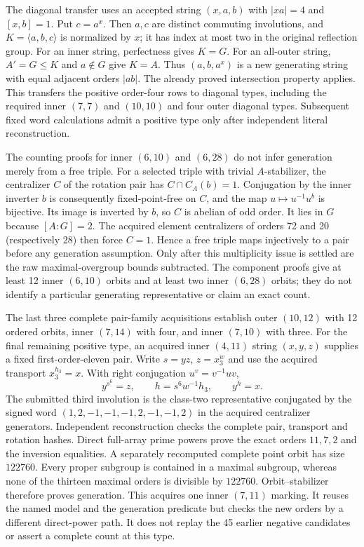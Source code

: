 \documentclass[11pt,a4paper]{article}
\newcommand{\gen}[1]{\langle #1\rangle}
\begin{document}
The diagonal transfer uses an accepted string $(x,a,b)$ with
$|xa|=4$ and $[x,b]=1$. Put $c=a^x$. Then $a,c$ are distinct commuting
involutions, and $K=\gen{a,b,c}$ is normalized by $x$; it has index at
most two in the original reflection group. For an inner string,
perfectness gives $K=G$. For an all-outer string, $A'=G\leq K$ and
$a\notin G$ give $K=A$. Thus $(a,b,a^x)$ is a new generating string
with equal adjacent orders $|ab|$. The already proved intersection
property applies. This transfers the positive order-four rows to diagonal
types, including the required inner $(7,7)$ and $(10,10)$ and four
outer diagonal types. Subsequent fixed word calculations admit a positive
type only after independent literal reconstruction.

The counting proofs for inner $(6,10)$ and $(6,28)$ do not infer
generation merely from a free triple. For a selected triple with trivial
$A$-stabilizer, the centralizer $C$ of the rotation pair has
$C\cap C_A(b)=1$. Conjugation by the inner inverter $b$ is consequently
fixed-point-free on $C$, and the map
$u\mapsto u^{-1}u^b$ is bijective. Its image is inverted by $b$, so
$C$ is abelian of odd order. It lies in $G$ because $[A:G]=2$.
The acquired element centralizers of orders 72 and 20 (respectively 28)
then force $C=1$. Hence a free triple maps injectively to a pair before
any generation assumption. Only after this multiplicity issue is settled
are the raw maximal-overgroup bounds subtracted. The component proofs
give at least 12 inner $(6,10)$ orbits and at least two inner $(6,28)$
orbits; they do not identify a particular generating representative or
claim an exact count.

The last three complete pair-family acquisitions establish outer
$(10,12)$ with 12 ordered orbits, inner $(7,14)$ with four, and inner
$(7,10)$ with three. For the final remaining positive type, an acquired
inner $(4,11)$ string $(x,y,z)$ supplies a fixed first-order-eleven pair.
Write $s=yz$, $z=x_3^w$ and use the acquired transport $x_3^{h_3}=x$.
With right conjugation $u^v=v^{-1}uv$,
\[
 y^{s^6}=z,\qquad h=s^6w^{-1}h_3,\qquad y^h=x.
\]
The submitted third involution is the class-two representative conjugated
by the signed word $(1,2,-1,-1,-1,2,-1,-1,2)$ in the acquired centralizer
generators. Independent reconstruction checks the complete pair,
transport and rotation hashes. Direct full-array prime powers prove
the exact orders $11,7,2$ and the inversion equalities. A separately
recomputed complete point orbit has size $122760$. Every proper subgroup
is contained in a maximal subgroup, whereas none of the thirteen maximal
orders is divisible by $122760$. Orbit--stabilizer therefore proves
generation. This acquires one inner $(7,11)$ marking. It reuses the
named model and the generation predicate but checks the new orders by a
different direct-power path. It does not replay the 45 earlier negative
candidates or assert a complete count at this type.
\end{document}
